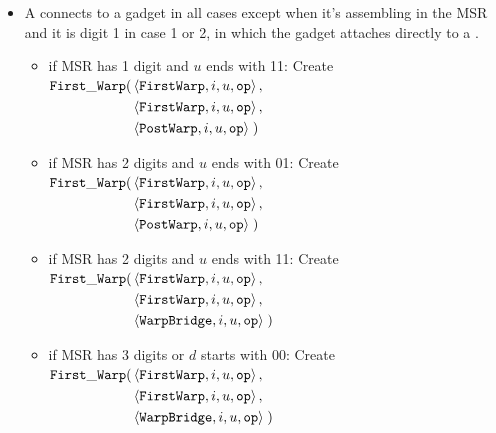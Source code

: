 \begin{itemize}
        \item A {\firstwarp} connects to a {\warpbridge} gadget in all cases except when it's assembling
              in the MSR and it is digit 1 in case 1 or 2, in which the {\firstwarp} gadget attaches directly
              to a {\postwarp}.

              \begin{itemize}
                \item if MSR has 1 digit and $u$ ends with 11: Create
                $\begin{aligned}[t]
                    {\tt First\_Warp}(& \left\langle {\tt FirstWarp}, i, u, {\tt op} \right\rangle, \\
                               & \left\langle {\tt FirstWarp}, i, u, {\tt op} \right\rangle, \\
                               & \left\langle {\tt PostWarp},  i, u, {\tt op} \right\rangle \;)
                \end{aligned}$
                \vspace{.5cm}


                \item if MSR has 2 digits and $u$ ends with 01: Create
                $\begin{aligned}[t]
                    {\tt First\_Warp}(& \left\langle {\tt FirstWarp}, i, u, {\tt op} \right\rangle, \\
                    & \left\langle {\tt FirstWarp},            i, u, {\tt op} \right\rangle, \\
                    & \left\langle {\tt PostWarp},             i, u, {\tt op} \right\rangle \;)
                \end{aligned}$
                \vspace{.5cm}


                \item if MSR has 2 digits and $u$ ends with 11: Create
                $\begin{aligned}[t]
                    {\tt First\_Warp}(& \left\langle {\tt FirstWarp}, i, u, {\tt op} \right\rangle, \\
                    & \left\langle {\tt FirstWarp},            i, u, {\tt op} \right\rangle, \\
                    & \left\langle {\tt WarpBridge},           i, u, {\tt op} \right\rangle \;)
                \end{aligned}$
                \vspace{.5cm}

                \item if MSR has 3 digits or $d$ starts with 00: Create
                $\begin{aligned}[t]
                    {\tt First\_Warp}(& \left\langle {\tt FirstWarp},  i, u, {\tt op} \right\rangle, \\
                               & \left\langle {\tt FirstWarp},  i, u, {\tt op} \right\rangle, \\
                               & \left\langle {\tt WarpBridge}, i, u, {\tt op} \right\rangle \;)
                \end{aligned}$


\end{itemize}
\end{itemize}
